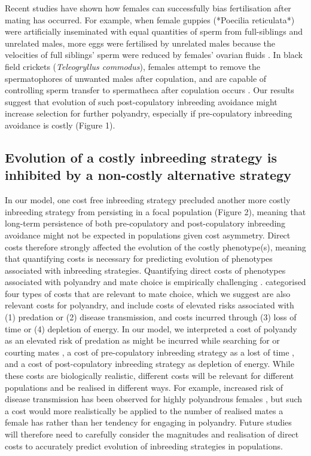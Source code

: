 \documentclass[10pt,letterpaper]{article}
\begin{document}
Recent studies have shown how females can successfully bias fertilisation after mating has occurred. For example, when female guppies (*Poecilia reticulata*) were artificially inseminated with equal quantities of sperm from full-siblings and unrelated males, more eggs were fertilised by unrelated males because the velocities of full siblings' sperm were reduced by females' ovarian fluids \cite[][]{Gasparini2011}. In black field crickets (\textit{Teleogryllus commodus}), females attempt to remove the spermatophores of unwanted males after copulation, and are capable of controlling sperm transfer to spermatheca after copulation occurs \cite{Bussiere2006, Tuni2013}. Our results suggest that evolution of such post-copulatory inbreeding avoidance might increase selection for further polyandry, especially if pre-copulatory inbreeding avoidance is costly (Figure 1).

\subsection*{Evolution of a costly inbreeding strategy is inhibited by a non-costly alternative strategy}

In our model, one cost free inbreeding strategy precluded another more costly inbreeding strategy from persisting in a focal population (Figure 2), meaning that long-term persistence of both pre-copulatory and post-copulatory inbreeding avoidance might not be expected in populations given cost asymmetry. Direct costs therefore strongly affected the evolution of the costly phenotype(s), meaning that quantifying costs is necessary for predicting evolution of phenotypes associated with inbreeding strategies. Quantifying direct costs of phenotypes associated with polyandry and mate choice is empirically challenging \cite[][]{Pomiankowski1987, Kokko2003, Reid2015}. \cite{Pomiankowski1987} categorised four types of costs that are relevant to mate choice, which we suggest are also relevant costs for polyandry, and include costs of elevated risks associated with (1) predation or (2) disease transmission, and costs incurred through (3) loss of time or (4) depletion of energy. In our model, we interpreted a cost of polyandy as an elevated risk of predation as might be incurred while searching for or courting mates \cite[e.g.,][]{Rowe1988, Rowe1994}, a cost of pre-copulatory inbreeding strategy as a lost of time \cite[i.e., risk of not finding a mate in time due to choosiness; e.g.,][]{Kokko2013}, and a cost of post-copulatory inbreeding strategy as depletion of energy. While these costs are biologically realistic, different costs will be relevant for different populations and be realised in different ways. For example, increased risk of disease transmission has been observed for highly polyandrous females \cite[][]{Roberts2015a}, but such a cost would more realistically be applied to the number of realised mates a female has rather than her tendency for engaging in polyandry. Future studies will therefore need to carefully consider the magnitudes and realisation of direct costs to accurately predict evolution of inbreeding strategies in populations. 
\end{document}
